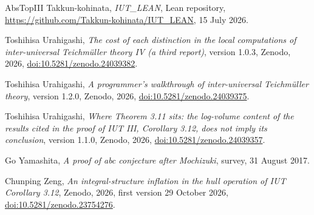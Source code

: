 \documentclass[11pt,a4paper]{article}
\theoremstyle{plain}
\theoremstyle{definition}
\theoremstyle{remark}
\begin{document}
\begin{thebibliography}{AbsTopIII}
Takkun-kohinata, \emph{IUT\_LEAN}, Lean repository, \url{https://github.com/Takkun-kohinata/IUT_LEAN}, 15 July 2026.

Toshihisa Urahigashi, \emph{The cost of each distinction in the local computations of inter-universal Teichm\"uller
theory IV (a third report)}, version 1.0.3, Zenodo, 2026,
\href{https://doi.org/10.5281/zenodo.24039382}{doi:10.5281/zenodo.24039382}.

Toshihisa Urahigashi, \emph{A programmer's walkthrough of inter-universal Teichm\"uller theory}, version 1.2.0,
Zenodo, 2026, \href{https://doi.org/10.5281/zenodo.24039375}{doi:10.5281/zenodo.24039375}.

Toshihisa Urahigashi, \emph{Where Theorem 3.11 sits: the log-volume content of the results cited in the proof of
IUT III, Corollary 3.12, does not imply its conclusion}, version 1.1.0, Zenodo, 2026,
\href{https://doi.org/10.5281/zenodo.24039357}{doi:10.5281/zenodo.24039357}.

Go Yamashita, \emph{A proof of abc conjecture after Mochizuki}, survey, 31 August 2017.

Chunping Zeng, \emph{An integral-structure inflation in the hull operation of IUT Corollary 3.12}, Zenodo, 2026,
first version 29 October 2026, \href{https://doi.org/10.5281/zenodo.23754276}{doi:10.5281/zenodo.23754276}.
\end{thebibliography}
\end{document}
